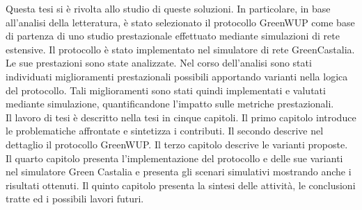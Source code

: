Questa tesi si è rivolta allo studio di queste soluzioni. In particolare, in base all'analisi della letteratura, è stato selezionato il protocollo GreenWUP come base di partenza di uno studio prestazionale effettuato mediante simulazioni di rete estensive. Il protocollo è stato implementato nel simulatore di rete GreenCastalia. Le sue prestazioni sono state analizzate. Nel corso dell'analisi sono stati individuati miglioramenti prestazionali possibili apportando varianti nella logica del protocollo. Tali miglioramenti  sono stati quindi implementati e valutati mediante simulazione, quantificandone l'impatto sulle metriche prestazionali.\\

Il lavoro di tesi è descritto nella tesi in cinque capitoli. Il primo capitolo introduce le problematiche affrontate e sintetizza i contributi. Il secondo descrive nel dettaglio il protocollo GreenWUP. Il terzo capitolo descrive le varianti proposte. Il quarto capitolo presenta l'implementazione del protocollo e delle sue varianti nel simulatore Green Castalia e presenta gli scenari simulativi mostrando anche i risultati ottenuti. Il quinto capitolo presenta la sintesi delle attività, le conclusioni tratte ed i possibili lavori futuri.